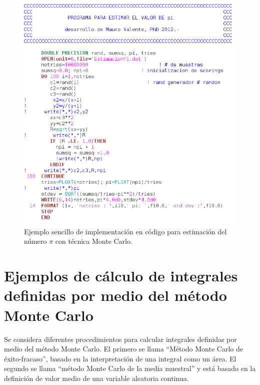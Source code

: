 \begin{center}
\begin{figure} [!h]

\centering
\includegraphics[width=12cm]{figures/Fig7_1.png}

\caption{Ejemplo sencillo de implementaci\'on en c\'odigo para estimaci\'on del n\'umero $\pi$ con t\'ecnica Monte Carlo.}
\label{Fig7_1}

\end{figure}
\end{center}




\section{Ejemplos de c\'alculo de integrales definidas por medio del m\'etodo Monte Carlo}
\label{CapVII_4}

Se considera diferentes procedimientos para calcular integrales definidas por medio del m\'etodo Monte Carlo.
%
El primero se llama ``M\'etodo Monte Carlo de \'exito-fracaso'', basado en la interpretaci\'on de una integral como un \'area.
%
El segundo se llama ``m\'etodo Monte Carlo de la media muestral'' y est\'a basado en la definici\'on de valor medio de una variable
aleatoria continua.
%

